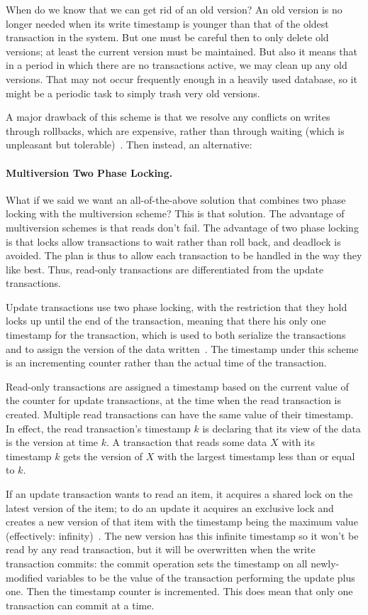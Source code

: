 When do we know that we can get rid of an old version? An old version is no longer needed when its write timestamp is younger than that of the oldest transaction in the system. But one must be careful then to only delete old versions; at least the current version must be maintained. But also it means that in a period in which there are no transactions active, we may clean up any old versions. That may not occur frequently enough in a heavily used database, so it might be a periodic task to simply trash very old versions.

A major drawback of this scheme is that we resolve any conflicts on writes through rollbacks, which are expensive, rather than through waiting (which is unpleasant but tolerable)~\cite{dsc}. Then instead, an alternative:

\paragraph{Multiversion Two Phase Locking.} What if we said we want an all-of-the-above solution that combines two phase locking with the multiversion scheme? This is that solution. The advantage of multiversion schemes is that reads don't fail. The advantage of two phase locking is that locks allow transactions to wait rather than roll back, and deadlock is avoided. The plan is thus to allow each transaction to be handled in the way they like best. Thus, read-only transactions are differentiated from the update transactions.

Update transactions use two phase locking, with the restriction that they hold locks up until the end of the transaction, meaning that there his only one timestamp for the transaction, which is used to both serialize the transactions and to assign the version of the data written~\cite{dsc}. The timestamp under this scheme is an incrementing counter rather than the actual time of the transaction. 

Read-only transactions are assigned a timestamp based on the current value of the counter for update transactions, at the time when the read transaction is created. Multiple read transactions can have the same value of their timestamp. In effect, the read transaction's timestamp $k$ is declaring that its view of the data is the version at time $k$. A transaction that reads some data $X$ with its timestamp $k$ gets the version of $X$ with the largest timestamp less than or equal to $k$. 

If an update transaction wants to read an item, it acquires a shared lock on the latest version of the item; to do an update it acquires an exclusive lock and creates a new version of that item with the timestamp being the maximum value (effectively: infinity)~\cite{dsc}. The new version has this infinite timestamp so it won't be read by any read transaction, but it will be overwritten when the write transaction commits:  the commit operation sets the timestamp on all newly-modified variables to be the value of the transaction performing the update plus one. Then the timestamp counter is incremented. This does mean that only one transaction can commit at a time.




